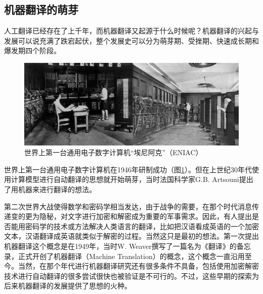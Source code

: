 
\subsection{机器翻译的萌芽}

\parinterval 人工翻译已经存在了上千年，而机器翻译又起源于什么时候呢？机器翻译的兴起与发展可以说充满了跌宕起伏，整个发展史可以分为萌芽期、受挫期、快速成长期和爆发期四个阶段。

\begin{figure}[htp]
    \centering
\includegraphics[scale=0.25]{./Chapter1/Figures/figure-eniac.jpg}
    \caption{世界上第一台通用电子数字计算机``埃尼阿克''（ENIAC）}%
    \label{fig:1-4}
\end{figure}

\parinterval 世界上第一台通用电子数字计算机在1946年研制成功（图\ref{fig:1-4}）。但在上世纪30年代使用计算模型进行自动翻译的思想就开始萌芽，当时法国科学家G.B. Artsouni提出了用机器来进行翻译的想法。

\parinterval 第二次世界大战使得数学和密码学相当发达，由于战争的需要，在那个时代消息传递变的更为隐秘，对文字进行加密和解密成为重要的军事需求。因此，有人提出是否能用密码学的技术或方法解决人类语言的翻译，比如把汉语看成英语的一个加密文本，汉语翻译成英语就类似于解密的过程。当然这只是最初的想法。第一次提出机器翻译这个概念是在1949年，当时W. Weaver撰写了一篇名为《翻译》的备忘录，正式开创了机器翻译（Machine Translation）的概念，这个概念一直沿用至今。当然，在那个年代进行机器翻译研究还有很多条件不具备，包括使用加密解密技术进行自动翻译的很多尝试很快也被验证是不可行的。不过，这些早期的探索为后来机器翻译的发展提供了思想的火种。


